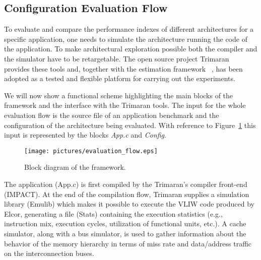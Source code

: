 \begin{table}
\end{table}
\subsection{Configuration Evaluation Flow}

To evaluate and compare the performance indexes of different
architectures for a specific application, one needs to simulate the
architecture running the code of the application. To make
architectural exploration possible both the compiler and the simulator
have to be retargetable. The open source project Trimaran~\cite{trimaran_hp} provides these
tools and, together with the estimation framework
\ee~\cite{Ascia2005940}, has been
adopted as a tested and flexible platform for carrying out the
experiments.

We will now show a functional scheme highlighting the main blocks of
the \ee{} framework and the interface with the Trimaran tools. The
input for the whole evaluation flow is the source file of an application
benchmark and the configuration of the architecture
being evaluated.  With reference to Figure~\ref{fig:evaluation_flow}
this input is represented by the blocks \emph{App.c} and
\emph{Config}.
\begin{figure}
        \centering
        \texttt{[image: pictures/evaluation\_flow.eps]}
        \caption{Block diagram of the framework.}
        \label{fig:evaluation_flow}
\end{figure}

The application (App.c) is first compiled by the Trimaran's compiler
front-end (IMPACT). At the end of the compilation flow,
Trimaran supplies a simulation library (Emulib) which makes it
possible to execute the VLIW code produced by Elcor, generating a file
(Stats) containing the execution statistics (e.g., instruction mix,
execution cycles, utilization of functional units, etc.). A cache
simulator, along with a bus simulator, is used to gather information
about the behavior of the memory hierarchy in terms of miss rate and
data/address traffic on the interconnection buses.

